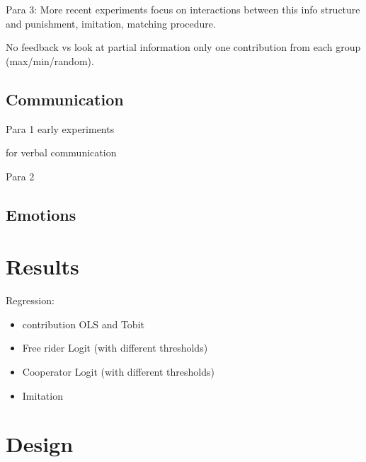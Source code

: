 \documentclass[11pt]{article}
\begin{document}
Para 3: More recent experiments focus on interactions between this info structure and punishment, imitation, matching procedure.




\cite{bigoni2012feedback}

\cite{nikiforakis2010feedback}

\cite{cox2015framing}

\cite{cason1999laboratory} No feedback vs 
\cite{irlenbusch2019designing} look at partial information only one contribution from each group (max/min/random).




\subsection{Communication}

Para 1 early experiments \cite{isaac1988communication}

\cite{wilson1997liar}

\cite{cason1999laboratory} for verbal communication


Para 2 
\cite{Oprea2014_ContinuousTime}

\cite{Haruvy2017_CommunicationVisibility}



\subsection{Emotions}
\cite{noussair2024role}



\section{Results}
Regression:
\begin{itemize}
    \item contribution OLS and Tobit
    \item Free rider Logit (with different thresholds)
    \item Cooperator Logit (with different thresholds)
    \item Imitation
\end{itemize}







\section{Design}
\end{document}

